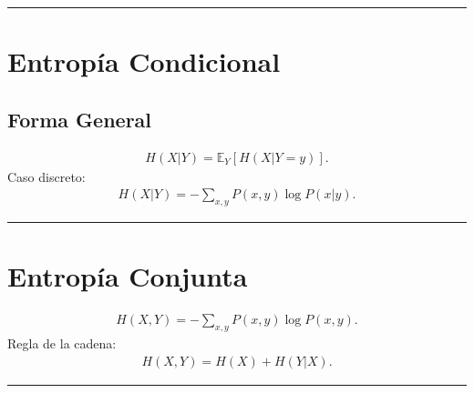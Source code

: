 \documentclass[letterpaper,10pt,english]{jupyterBook}
\begin{document}
\bigskip\hrule\bigskip



\section{Entropía Condicional}
\label{\detokenize{02_mathematical_foundations/formal_definitions:entropia-condicional}}

\subsection{Forma General}
\label{\detokenize{02_mathematical_foundations/formal_definitions:forma-general}}\begin{equation*}
\begin{split}
H(X|Y)=\mathbb{E}_{Y}[H(X|Y=y)].
\end{split}
\end{equation*}
\sphinxAtStartPar
Caso discreto:
\begin{equation*}
\begin{split}
H(X|Y)=-\sum_{x,y}P(x,y)\log P(x|y).
\end{split}
\end{equation*}

\bigskip\hrule\bigskip



\section{Entropía Conjunta}
\label{\detokenize{02_mathematical_foundations/formal_definitions:entropia-conjunta}}\begin{equation*}
\begin{split}
H(X,Y)=-\sum_{x,y}P(x,y)\log P(x,y).
\end{split}
\end{equation*}
\sphinxAtStartPar
Regla de la cadena:
\begin{equation*}
\begin{split}
H(X,Y)=H(X)+H(Y|X).
\end{split}
\end{equation*}

\bigskip\hrule\bigskip
\end{document}
